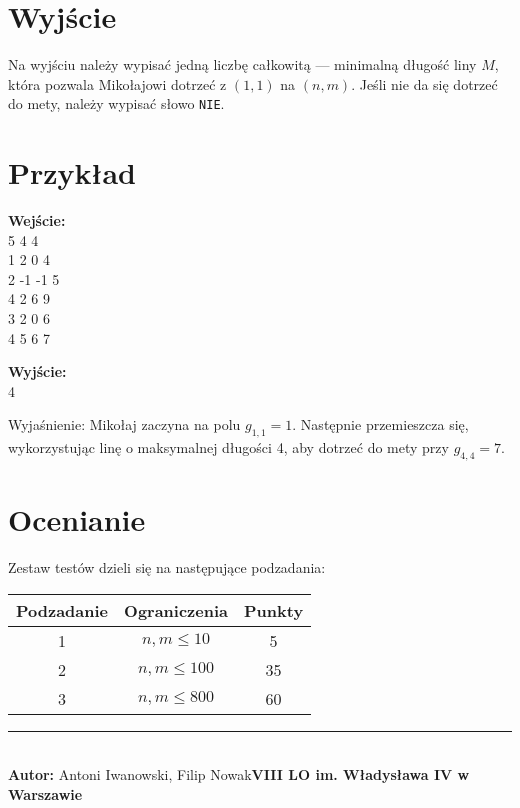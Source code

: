 \documentclass[a4paper,11pt]{article}
\newcommand{\exampleinput}{\\5 4 4
\\1 2 0 4
\\2 -1 -1 5
\\4 2 6 9
\\3 2 0 6
\\4 5 6 7}
\newcommand{\exampleoutput}{\\4}
\newcommand{\explanation}{Mikołaj zaczyna na polu \( g_{1,1} = 1 \). Następnie przemieszcza się, wykorzystując linę o maksymalnej długości 4, aby dotrzeć do mety przy \( g_{4,4} = 7 \).}
\newcommand{\authorinfo}{Antoni Iwanowski, Filip Nowak}
\newcommand{\schoolinfo}{VIII LO im. Władysława IV w Warszawie}
\newcommand{\subtasktable}{%
\begin{tabular}{|c|c|c|}
\hline
Podzadanie & Ograniczenia & Punkty \\
\hline
1 & $n, m \leq 10$ & 5 \\
2 & $n, m \leq 100$ & 35 \\
3 & $n, m \leq 800$ & 60 \\
\hline
\end{tabular}}
\begin{document}
\section*{Wyjście}
Na wyjściu należy wypisać jedną liczbę całkowitą — minimalną długość liny \( M \), która pozwala Mikołajowi dotrzeć z \( (1, 1) \) na \( (n, m) \). Jeśli nie da się dotrzeć do mety, należy wypisać słowo \texttt{NIE}.
\newpage
\section*{Przykład}
\vspace{-0.5cm}
\begin{multicols}{2}
\noindent\textbf{Wejście:}
\exampleinput

\columnbreak

\noindent\textbf{Wyjście:}
\exampleoutput
\end{multicols}

\noindent Wyjaśnienie: \explanation

\section*{Ocenianie}
Zestaw testów dzieli się na następujące podzadania:
\begin{center}
\subtasktable
\end{center}

\vspace*{\fill}
\noindent \rule{\textwidth}{0.4pt} \\
\textbf{Autor:} \authorinfo  \hfill \textbf{\schoolinfo} \\
\end{document}
